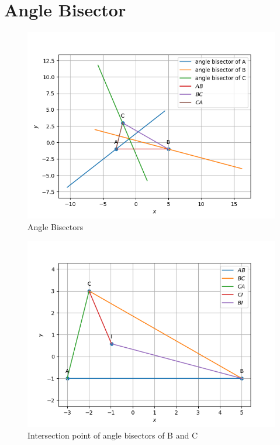 \documentclass[journal,12pt,twocolumn]{IEEEtran}
\theoremstyle{remark}
\begin{document}
\section{Angle Bisector}
\begin{figure}[!ht]
              \centering
              \includegraphics[width=\columnwidth]{./figs/fig1.5.1.png}
              \caption{Angle Bisectors}
              \label{fig:16}
\end{figure}
\begin{figure}[!ht]
              \centering
              \includegraphics[width=\columnwidth]{./figs/fig1.5.2.png}
              \caption{Intersection point of angle bisectors of B and C}
              \label{fig:17}
\end{figure}
\end{document}
